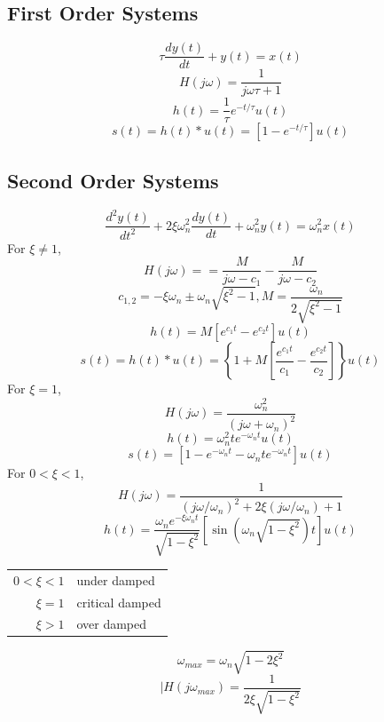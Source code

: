 \documentclass[landscape,a4paper]{article}
\begin{document}
\begin{multicols}{3}
\subsection*{First Order Systems}
$$\tau\frac{dy(t)}{dt}+y(t)=x(t)$$
$$H(j\omega)=\frac{1}{j\omega\tau+1}$$
$$h(t)=\frac{1}{\tau}e^{-t/\tau}u(t)$$
$$s(t)=h(t)*u(t)=[1-e^{-t/\tau}]u(t)$$

\subsection*{Second Order Systems}
$$\frac{d^2y(t)}{dt^2}+2\xi\omega_n^2\frac{dy(t)}{dt}+\omega_n^2y(t)=\omega_n^2x(t)$$
For $\xi\neq1$,
$$H(j\omega)==\frac{M}{j\omega-c_1}-\frac{M}{j\omega-c_2}$$
$$c_{1,2}=-\xi\omega_n\pm\omega_n\sqrt{\xi^2-1},M=\frac{\omega_n}{2\sqrt{\xi^2-1}}$$
$$h(t)=M[e^{c_1t}-e^{c_2t}]u(t)$$
$$s(t)=h(t)*u(t)=\left\{1+M\left[\frac{e^{c_1t}}{c_1}-\frac{e^{c_2t}}{c_2}\right]\right\}u(t)$$
For $\xi=1$,
$$H(j\omega)=\frac{\omega_n^2}{(j\omega+\omega_n)^2}$$
$$h(t)=\omega_n^2te^{-\omega_nt}u(t)$$
$$s(t)=[1-e^{-\omega_nt}-\omega_nte^{-\omega_nt}]u(t)$$
For $0<\xi<1$,
$$H(j\omega)=\frac{1}{(j\omega/\omega_n)^2+2\xi(j\omega/\omega_n)+1}$$
$$h(t)=\frac{\omega_ne^{-\xi\omega_nt}}{\sqrt{1-\xi^2}}[\sin(\omega_n\sqrt{1-\xi^2})t]u(t)$$

\begin{center}
\begin{tabular}{rl}
	$0<\xi<1$ & under damped \\
	$\xi=1$ & critical damped \\
	$\xi>1$ & over damped \\
\end{tabular}
\end{center}

$$\omega_{max}=\omega_n\sqrt{1-2\xi^2}$$
$$|H(j\omega_{max})=\frac{1}{2\xi\sqrt{1-\xi^2}}$$

\end{multicols}


\setcounter{section}{6}

\pagestyle{empty}
\end{document}
